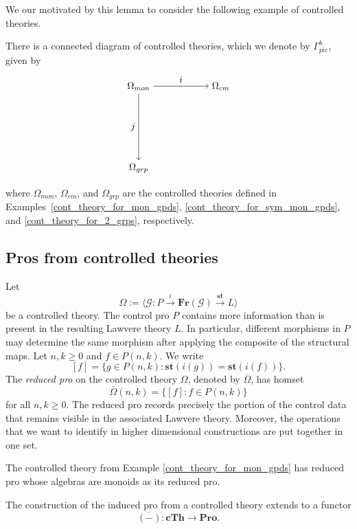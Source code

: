 \documentclass{tac}
\begin{document}
We our motivated by this lemma to consider the following example of controlled theories. 

\begin{example}\label{conn_diag_cont_theory_for_Pic}
There is a connected diagram of controlled theories, which we denote by
$\Gamma^b_{pic}$, given by
\[
\begin{tikzpicture}[node distance=3cm,auto]
\node (A) {$\Omega_{mon}$};
\node (B)[right of=A] {$\Omega_{cm}$};
\node (C)[below of=A] {$\Omega_{grp}$};

\draw[->] (A) -- node[above] {$i$} (B);
\draw[->] (A) -- node[left] {$j$} (C);
\end{tikzpicture}
\]
where $\Omega_{mon}$, $\Omega_{cm}$, and $\Omega_{grp}$ are the controlled
theories defined in Examples~\ref{cont_theory_for_mon_gpds},
\ref{cont_theory_for_sym_mon_gpds}, and \ref{cont_theory_for_2_grps},
respectively.
\end{example}

\subsection*{Pros from controlled theories}
Let
\[
\Omega:=\langle \mathcal{G}:P\xrightarrow{i}\mathbf{Fr}(\mathcal{G})
\xrightarrow{\mathbf{st}}L\rangle
\]
be a controlled theory. The control pro $P$ contains more information than is
present in the resulting Lawvere theory $L$. In particular, different
morphisms in $P$ may determine the same morphism after applying the composite of the structural
maps.  Let $n,k\geq 0$ and $f\in P(n,k)$. We write 
\[
[f]=\{g\in P(n,k):\mathbf{st}(i(g))=\mathbf{st}(i(f))\}.
\]
The \emph{reduced pro} on the controlled theory $\Omega$, denoted by $\overline{\Omega}$, has homset 
\[
\overline{\Omega}(n,k)=\{[f]:f\in P(n,k)\}
\]
for all $n,k\geq 0$. The reduced pro records precisely the portion of the
control data that remains visible in the associated Lawvere theory. Moreover, the operations that we want to identify in higher dimensional constructions are put together in one set.

 \begin{example}
The controlled theory from Example \ref{cont_theory_for_mon_gpds} has reduced pro whose algebras are monoids as its reduced pro. 
 \end{example}

 \begin{lemma}\label{reduced_pro}
The construction of the induced pro from a controlled theory extends to a functor 
\[
\overline{(-)}:\mathbf{cTh}\to\mathbf{Pro}.
\]
 \end{lemma}
\end{document}
